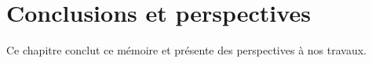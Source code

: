 \chapter{Conclusions et perspectives}
\label{chapter:conclusions}

\minitoc

Ce chapitre conclut ce mémoire et présente des perspectives à nos travaux.

